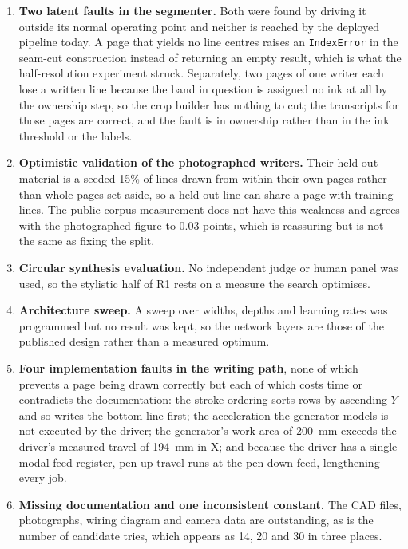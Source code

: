 \begin{enumerate}
          \item \textbf{Two latent faults in the segmenter.} Both were found by driving it outside its normal operating point and neither is reached by the deployed pipeline today.
          A page that yields no line centres raises an \texttt{IndexError} in the seam-cut construction instead of returning an empty result, which is what the half-resolution experiment struck.
          Separately, two pages of one writer each lose a written line because the band in question is assigned no ink at all by the ownership step, so the crop builder has nothing to cut; the transcripts for those pages are correct, and the fault is in ownership rather than in the ink threshold or the labels.
          \item \textbf{Optimistic validation of the photographed writers.} Their held-out material is a seeded 15\% of lines drawn from within their own pages rather than whole pages set aside, so a held-out line can share a page with training lines.
          The public-corpus measurement does not have this weakness and agrees with the photographed figure to 0.03 points, which is reassuring but is not the same as fixing the split.
          \item \textbf{Circular synthesis evaluation.} No independent judge or human panel was used, so the stylistic half of R1 rests on a measure the search optimises.
          \item \textbf{Architecture sweep.} A sweep over widths, depths and learning rates was programmed but no result was kept, so the network layers are those of the published design rather than a measured optimum.
          \item \textbf{Four implementation faults in the writing path}, none of which prevents a page being drawn correctly but each of which costs time or contradicts the documentation: the stroke ordering sorts rows by ascending $Y$ and so writes the bottom line first; the acceleration the generator models is not executed by the driver; the generator's work area of 200~mm exceeds the driver's measured travel of 194~mm in X; and because the driver has a single modal feed register, pen-up travel runs at the pen-down feed, lengthening every job.
          \item \textbf{Missing documentation and one inconsistent constant.} The CAD files, photographs, wiring diagram and camera data are outstanding, as is the number of candidate tries, which appears as 14, 20 and 30 in three places. 

\end{enumerate}
